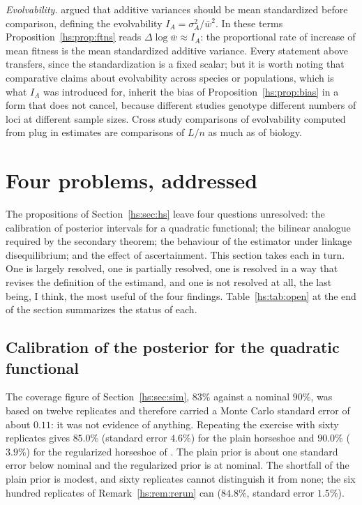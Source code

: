 \emph{Evolvability.} \citet{hs:houle1992comparing} argued that additive variances should be mean standardized before comparison, defining the evolvability $I_A = \sigma^2_A/\bar w^2$. In these terms Proposition~\ref{hs:prop:ftns} reads $\Delta \log \bar w \approx I_A$: the proportional rate of increase of mean fitness is the mean standardized additive variance. Every statement above transfers, since the standardization is a fixed scalar; but it is worth noting that comparative claims about evolvability across species or populations, which is what $I_A$ was introduced for, inherit the bias of Proposition~\ref{hs:prop:bias} in a form that does not cancel, because different studies genotype different numbers of loci at different sample sizes. Cross study comparisons of evolvability computed from plug in estimates are comparisons of $L/n$ as much as of biology.

\section{Four problems, addressed}
\label{hs:sec:open}

The propositions of Section~\ref{hs:sec:hs} leave four questions unresolved: the calibration of posterior intervals for a quadratic functional; the bilinear analogue required by the secondary theorem; the behaviour of the estimator under linkage disequilibrium; and the effect of ascertainment. This section takes each in turn. One is largely resolved, one is partially resolved, one is resolved in a way that revises the definition of the estimand, and one is not resolved at all, the last being, I think, the most useful of the four findings. Table~\ref{hs:tab:open} at the end of the section summarizes the status of each.

\subsection{Calibration of the posterior for the quadratic functional}

The coverage figure of Section~\ref{hs:sec:sim}, $83\%$ against a nominal $90\%$, was based on twelve replicates and therefore carried a Monte Carlo standard error of about $0.11$: it was not evidence of anything. Repeating the exercise with sixty replicates gives $85.0\%$ (standard error $4.6\%$) for the plain horseshoe and $90.0\%$ ($3.9\%$) for the regularized horseshoe of \citet{hs:piironen2017sparsity}. The plain prior is about one standard error below nominal and the regularized prior is at nominal. The shortfall of the plain prior is modest, and sixty replicates cannot distinguish it from none; the six hundred replicates of Remark~\ref{hs:rem:rerun} can ($84.8\%$, standard error $1.5\%$).

